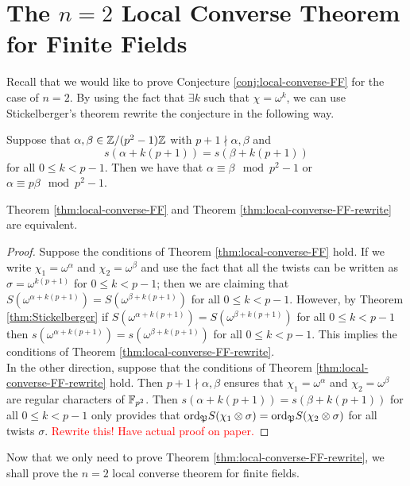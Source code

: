 \section{The $n=2$ Local Converse Theorem for Finite Fields}
Recall that we would like to prove Conjecture \ref{conj:local-converse-FF} for the case of $n=2$.
By using the fact that $\exists k$ such that $\chi = \omega^k$, we can use Stickelberger's theorem rewrite the conjecture in the following way.

\begin{theorem}\label{thm:local-converse-FF-rewrite}
Suppose that $\alpha, \beta \in \mathbb{Z}/(p^2 -1)\mathbb{Z}$ with $p+1 \nmid \alpha, \beta$ and \[s(\alpha + k(p+1)) = s(\beta + k(p+1))\] for all $0 \leq k < p-1$. Then we have that $\alpha \equiv \beta \mod p^2 - 1$ or $\alpha \equiv p \beta \mod p^2 -1$.
\end{theorem}

\begin{prop}
Theorem \ref{thm:local-converse-FF} and Theorem \ref{thm:local-converse-FF-rewrite} are equivalent.
\end{prop}

\begin{proof}
Suppose the conditions of Theorem \ref{thm:local-converse-FF} hold. 
If we write $\chi_1 = \omega^\alpha$ and $\chi_2 = \omega^\beta$ and use the fact that all the twists can be written as $\sigma = \omega^{k (p+1)}$ for $0 \leq k < p-1$; then we are claiming that $S(\omega^{\alpha + k(p+1)}) = S(\omega^{\beta+k(p+1)})$ for all $0 \leq k < p-1$. 
However, by Theorem \ref{thm:Stickelberger} if $S(\omega^{\alpha + k(p+1)}) = S(\omega^{\beta+k(p+1)})$ for all $0 \leq k < p-1$ then $s(\omega^{\alpha + k(p+1)}) = s(\omega^{\beta+k(p+1)})$ for all $0 \leq k < p-1$. 
This implies the conditions of Theorem \ref{thm:local-converse-FF-rewrite}.
\\

In the other direction, suppose that the conditions of Theorem \ref{thm:local-converse-FF-rewrite} hold. 
Then $p+1 \nmid \alpha, \beta$ ensures that $\chi_1 = \omega^\alpha$ and $\chi_2 = \omega^\beta$ are regular characters of $\mathbb{F}_{p^2}$. Then $s(\alpha + k(p+1)) = s(\beta + k(p+1))$ for all $0 \leq k < p-1$ only provides that $\textrm{ord}_{\mathfrak{P}} S(\chi_1 \otimes \sigma) = \textrm{ord}_{\mathfrak{P}} S(\chi_2 \otimes \sigma)$ for all twists $\sigma$. \textcolor{red}{Rewrite this! Have actual proof on paper.}

\end{proof}

Now that we only need to prove Theorem \ref{thm:local-converse-FF-rewrite}, we shall prove the $n=2$ local converse theorem for finite fields.

